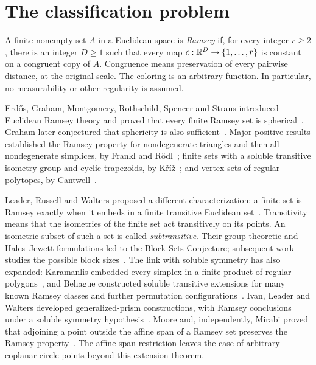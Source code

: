 \section{The classification problem}

A finite nonempty set $A$ in a Euclidean space is \emph{Ramsey} if, for
every integer $r\ge2$, there is an integer $D\ge1$ such that every map
$c:\mathbb R^D\to\{1,\ldots,r\}$ is constant on a congruent copy of $A$.
Congruence means preservation of every pairwise distance, at the original
scale. The coloring is an arbitrary function. In particular, no
measurability or other regularity is assumed.

Erd\H{o}s, Graham, Montgomery, Rothschild, Spencer and Straus introduced
Euclidean Ramsey theory and proved that every finite Ramsey set is
spherical~\cite[Theorem~13]{egm-rss}. Graham later conjectured that
sphericity is also sufficient~\cite{graham-survey}. Major positive
results established the Ramsey property for nondegenerate triangles
and then all nondegenerate simplices, by Frankl and
R\"odl~\cite{frankl-rodl-triangles,frankl-rodl-simplices}; finite sets
with a soluble transitive isometry group and cyclic trapezoids, by
K\v{r}\'i\v{z}~\cite{kriz-permutation,kriz-trapezoids}; and vertex sets
of regular polytopes, by Cantwell~\cite{cantwell-polytopes}.

Leader, Russell and Walters proposed a different characterization:
a finite set is Ramsey exactly when it embeds in a finite transitive
Euclidean set~\cite[Conjecture~A]{lrw-transitive}. Transitivity means
that the isometries of the finite set act transitively on its points.
An isometric subset of such a set is called \emph{subtransitive}.
Their group-theoretic and Hales--Jewett formulations led to the
Block Sets Conjecture; subsequent work studies the possible block
sizes~\cite{ilw-blocks}. The link with soluble symmetry has also
expanded: Karamanlis embedded every simplex in a finite product of
regular polygons~\cite{karamanlis-tori}, and Behague constructed
soluble transitive extensions for many known Ramsey classes and
further permutation configurations~\cite{behague-subsoluble}.
Ivan, Leader and Walters developed generalized-prism constructions,
with Ramsey conclusions under a soluble symmetry
hypothesis~\cite{ilw-prisms}. Moore and, independently, Mirabi proved
that adjoining a point outside the affine span of a Ramsey set
preserves the Ramsey property~\cite{moore-pyramid,mirabi-extensions}.
The affine-span restriction leaves the case of arbitrary coplanar
circle points beyond this extension theorem.


